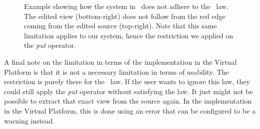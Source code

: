 \begin{figure}
    \centering
    \caption{Example showing how the system in~\cite{stuanciulescu2016} does not adhere to the \putget~law. The edited view (bottom-right) does not follow from the red edge
             coming from the edited source (top-right). Note that this same limitation applies to our system, hence the restriction we applied on the \emph{put} operator.}
    \label{fig:prevsystem:counterexample}
\end{figure}

A final note on the limitation in terms of the implementation in the Virtual
Platform is that it is not a necessary limitation in terms of usability. The
restriction is purely there for the \putget~law. If the user wants to ignore
this law, they could still apply the \emph{put} operator without satisfying the
law. It just might not be possible to extract that exact view from the source
again. In the implementation in the Virtual Platform, this is done using an
error that can be configured to be a warning instead.
